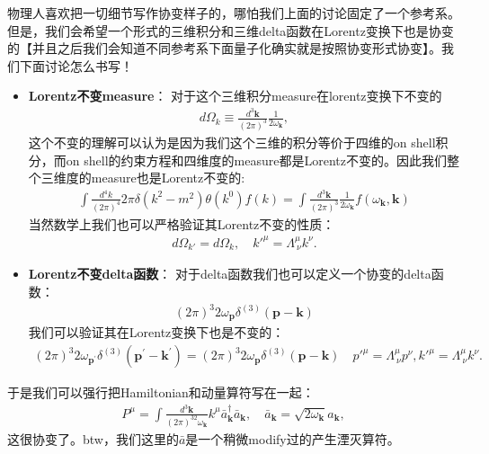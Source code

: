 物理人喜欢把一切细节写作协变样子的，哪怕我们上面的讨论固定了一个参考系。但是，我们会希望一个形式的三维积分和三维delta函数在Lorentz变换下也是协变的【并且之后我们会知道不同参考系下面量子化确实就是按照协变形式协变】。我们下面讨论怎么书写！
\begin{itemize}
  \item \textbf{Lorentz不变measure}： 对于这个三维积分measure在lorentz变换下不变的
    \begin{align}
      d\Omega_k\equiv\frac{d^3\mathbf{k}}{(2\pi)^3}\frac{1}{2\omega_\mathbf{k}},
    \end{align}
    这个不变的理解可以认为是因为我们这个三维的积分等价于四维的on shell积分，而on
    shell的约束方程和四维度的measure都是Lorentz不变的。因此我们整个三维度的measure也是Lorentz不变的:
    \begin{align}
      \int\frac{d^4k}{(2\pi)^4}2\pi\delta(k^2-m^2)\theta(k^0)f(k)=\int\frac{d^3\mathbf{k}}{(2\pi)^3}\frac{1}{2\omega_\mathbf{k}}f(\omega_\mathbf{k},\mathbf{k})
    \end{align}
    当然数学上我们也可以严格验证其Lorentz不变的性质：
    \begin{align}
      d\Omega_{k'}=d\Omega_k,\quad k'^\mu=\Lambda^\mu_{\ \nu}k^\nu.
    \end{align}
  \item \textbf{Lorentz不变delta函数}： 对于delta函数我们也可以定义一个协变的delta函数：
    \begin{align}
      (2\pi)^3 2\omega_\mathbf{p} \delta^{(3)}(\mathbf{p}-\mathbf{k})
    \end{align}
    我们可以验证其在Lorentz变换下也是不变的：
    \begin{align}
      (2\pi)^3
      2\omega_{\mathbf{p}^{\prime}}\delta^{(3)}(\mathbf{p}^{\prime}-\mathbf{k}^{\prime})=(2
      \pi )^3 2\omega_\mathbf{p}\delta^{(3)}(\mathbf{p}-\mathbf{k})
      \quad  p'^\mu=\Lambda^\mu_{\ \nu}p^\nu,k'^\mu=\Lambda^\mu_{\ \nu}k^\nu.
    \end{align}
\end{itemize}
于是我们可以强行把Hamiltonian和动量算符写在一起：
\begin{align}
  P^\mu=\int\frac{d^3\mathbf{k}}{(2\pi)^32\omega_\mathbf{k}}k^\mu\bar{a}_\mathbf{k}^\dagger\bar{a}_\mathbf{k},\quad\bar{a}_\mathbf{k}=\sqrt{2\omega_\mathbf{k}}a_\mathbf{k},
\end{align}
这很协变了。btw，我们这里的$ \bar{a} $是一个稍微modify过的产生湮灭算符。
